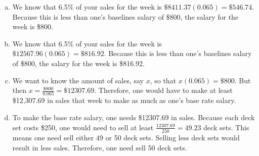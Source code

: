 \documentclass[11pt,letterpaper]{article}
\begin{document}
\sol
{\itshape
\begin{enumerate}[(a)]
\item We know that 6.5\% of your sales for the week is $\$8411.37(0.065)= \$546.74$. Because this is less than one's baselines salary of \$800, the salary for the week is \$800. \pspace

\item We know that 6.5\% of your sales for the week is $\$12567.96(0.065)= \$816.92$. Because this is less than one's baselines salary of \$800, the salary for the week is \$816.92. \pspace

\item We want to know the amount of sales, say $x$, so that $x(0.065)= \$800$. But then $x= \frac{\$800}{0.065}= \$12307.69$. Therefore, one would have to make at least \$12,307.69 in sales that week to make as much as one's base rate salary. \pspace

\item To make the base rate salary, one needs \$12307.69 in sales. Because each deck set costs \$250, one would need to sell at least $\frac{12307.69}{250}= 49.23$ deck sets. This means one need sell either 49 or 50 deck sets. Selling less deck sets would result in less sales. Therefore, one need sell 50 deck sets. 
\end{enumerate}
}


\end{document}
